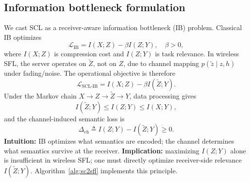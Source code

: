 \documentclass[10pt,journal]{IEEEtran}
\begin{document}
\subsection{Information bottleneck formulation}
We cast SCL as a receiver-aware information bottleneck (IB) problem\cite{tishby2000informationbottleneckmethod,9082644}. Classical IB optimizes
\begin{equation}
\mathcal{L}_{\mathrm{IB}}=I(X;Z)-\beta I(Z;Y),\quad \beta>0,
\end{equation}
where $I(X;Z)$ is compression cost and $I(Z;Y)$ is task relevance.
In wireless SFL, the server operates on $\tilde{Z}$, not on $Z$, due to channel mapping $p(\tilde{z}\mid z,h)$ under fading/noise\cite{9014530,9042352}. The operational objective is therefore
\begin{equation}
\mathcal{L}_{\mathrm{SCL\mbox{-}IB}}=I(X;Z)-\beta I(\tilde{Z};Y).
\end{equation}
Under the Markov chain $X\rightarrow Z\rightarrow \tilde{Z}\rightarrow Y$, data processing gives
\begin{equation}
I(\tilde{Z};Y) \le I(Z;Y) \le I(X;Y),
\end{equation}
and the channel-induced semantic loss is
\begin{equation}
\Delta_{\mathrm{ch}}
\triangleq
I(Z;Y)-I(\tilde{Z};Y)
\ge 0.
\end{equation}
\textbf{Intuition:} IB optimizes what semantics are encoded; the channel determines what semantics survive at the receiver.
\textbf{Implication:} maximizing $I(Z;Y)$ alone is insufficient in wireless SFL; one must directly optimize receiver-side relevance $I(\tilde{Z};Y)$. Algorithm~\ref{alg:sc2sfl} implements this principle.
\end{document}
